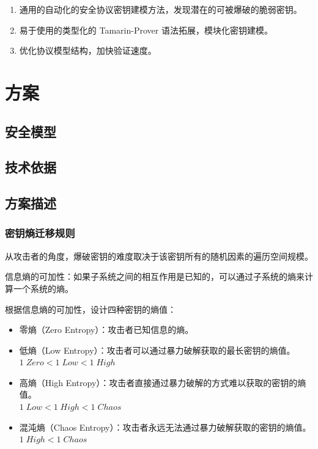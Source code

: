 \documentclass[UTF8]{ctexart}
\begin{document}
\begin{enumerate}
    \item 通用的自动化的安全协议密钥建模方法，发现潜在的可被爆破的脆弱密钥。
    \item 易于使用的类型化的 Tamarin-Prover 语法拓展，模块化密钥建模。
    \item 优化协议模型结构，加快验证速度。
\end{enumerate}

\section{方案}
\subsection{安全模型}

\subsection{技术依据}

\subsection{方案描述}

\subsubsection{密钥熵迁移规则}

从攻击者的角度，爆破密钥的难度取决于该密钥所有的随机因素的遍历空间规模。

信息熵的可加性：如果子系统之间的相互作用是已知的，可以通过子系统的熵来计算一个系统的熵。

根据信息熵的可加性，设计四种密钥的熵值：
\begin{itemize}
    \item 零熵（Zero Entropy）：攻击者已知信息的熵。
    \item 低熵（Low Entropy）：攻击者可以通过暴力破解获取的最长密钥的熵值。\\
            $1\;Zero < 1\;Low < 1\;High$
    \item 高熵（High Entropy）：攻击者直接通过暴力破解的方式难以获取的密钥的熵值。\\
            $1\;Low < 1\;High < 1\;Chaos$
    \item 混沌熵（Chaos Entropy）：攻击者永远无法通过暴力破解获取的密钥的熵值。\\
            $1\;High < 1\;Chaos$
\end{itemize}
\end{document}
